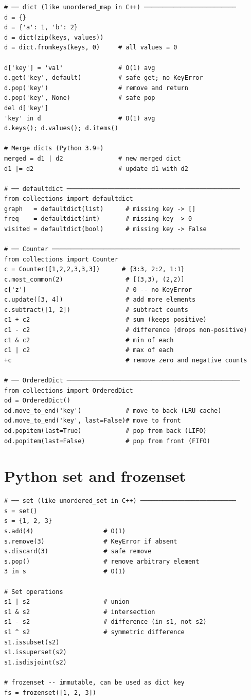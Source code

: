 \documentclass[11pt,a4paper]{report}
\begin{document}
\begin{lstlisting}
# ── dict (like unordered_map in C++) ─────────────────────────
d = {}
d = {'a': 1, 'b': 2}
d = dict(zip(keys, values))
d = dict.fromkeys(keys, 0)     # all values = 0

d['key'] = 'val'               # O(1) avg
d.get('key', default)          # safe get; no KeyError
d.pop('key')                   # remove and return
d.pop('key', None)             # safe pop
del d['key']
'key' in d                     # O(1) avg
d.keys(); d.values(); d.items()

# Merge dicts (Python 3.9+)
merged = d1 | d2               # new merged dict
d1 |= d2                       # update d1 with d2

# ── defaultdict ───────────────────────────────────────────────
from collections import defaultdict
graph   = defaultdict(list)      # missing key -> []
freq    = defaultdict(int)       # missing key -> 0
visited = defaultdict(bool)      # missing key -> False

# ── Counter ───────────────────────────────────────────────────
from collections import Counter
c = Counter([1,2,2,3,3,3])      # {3:3, 2:2, 1:1}
c.most_common(2)                 # [(3,3), (2,2)]
c['z']                           # 0 -- no KeyError
c.update([3, 4])                 # add more elements
c.subtract([1, 2])               # subtract counts
c1 + c2                          # sum (keeps positive)
c1 - c2                          # difference (drops non-positive)
c1 & c2                          # min of each
c1 | c2                          # max of each
+c                               # remove zero and negative counts

# ── OrderedDict ───────────────────────────────────────────────
from collections import OrderedDict
od = OrderedDict()
od.move_to_end('key')            # move to back (LRU cache)
od.move_to_end('key', last=False)# move to front
od.popitem(last=True)            # pop from back (LIFO)
od.popitem(last=False)           # pop from front (FIFO)
\end{lstlisting}

\section{Python set and frozenset}

\begin{lstlisting}
# ── set (like unordered_set in C++) ──────────────────────────
s = set()
s = {1, 2, 3}
s.add(4)                   # O(1)
s.remove(3)                # KeyError if absent
s.discard(3)               # safe remove
s.pop()                    # remove arbitrary element
3 in s                     # O(1)

# Set operations
s1 | s2                    # union
s1 & s2                    # intersection
s1 - s2                    # difference (in s1, not s2)
s1 ^ s2                    # symmetric difference
s1.issubset(s2)
s1.issuperset(s2)
s1.isdisjoint(s2)

# frozenset -- immutable, can be used as dict key
fs = frozenset([1, 2, 3])
\end{lstlisting}
\end{document}
